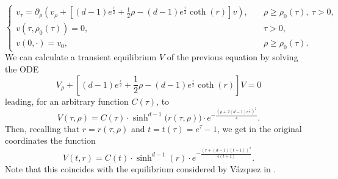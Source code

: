 \documentclass[12pt,longbibliography]{article}
\theoremstyle{definition}
\theoremstyle{remark}
\theoremstyle{example}
\begin{document}
\begin{equation}\label{eq:main_spherical_coordinates_symmetric_datum}
\begin{cases}
	v_\tau = \partial_\rho\left(v_\rho + \left[(d-1)e^{\frac{\tau}{2}}+\frac{1}{2}\rho- (d-1)e^{\frac{\tau}{2}}\coth(r)\right]  v\right),\quad &\rho\geq \rho_0(\tau),\ \tau>0,\\
	v(\tau, \rho_0(\tau))=0, &\tau>0,\\
	v(0,\cdot) = v_0, &\rho\geq \rho_0(\tau).
\end{cases}
\end{equation}
We can calculate a transient equilibrium $V$ of the previous equation by solving the ODE
\[
V_\rho + \left[(d-1)e^{\frac{\tau}{2}}+\frac{1}{2}\rho- (d-1)e^{\frac{\tau}{2}}\coth(r)\right]  V = 0
\]
leading, for an arbitrary function $C(\tau)$, to
\begin{equation}\label{eq:def_V}
V(\tau, \rho) = C(\tau)\cdot \sinh^{d-1}\big(r(\tau, \rho)\big)\cdot e^{- \frac{\left(\rho + 2(d-1)e^\frac{\tau}{2}\right)^2}{4}}.
\end{equation}
Then, recalling that $r=r(\tau,\rho)$ and $t=t(\tau)= e^\tau-1$, we get in the original coordinates the function
\[
V(t,r) = C(t)\cdot \sinh^{d-1}(r)\cdot e^{- \frac{\left(r + (d-1)(t+1)\right)^2}{4(t+1)}}.
\]
Note that this coincides with the equilibrium considered by Vázquez in \cite[Theorem 5.1]{vazquez1992asymptotic}.
\end{document}
